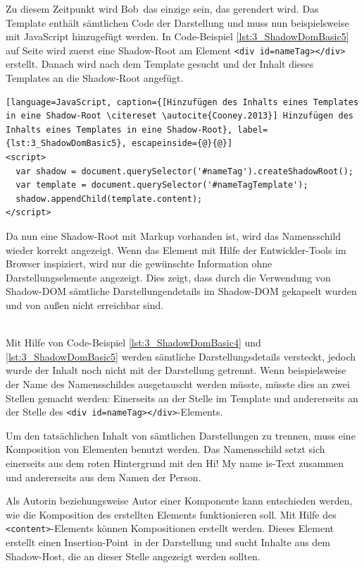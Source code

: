 \begin{enumerate}
Zu diesem Zeitpunkt wird \glqq Bob\grqq\ das einzige sein, das gerendert wird. Das Template enthält sämtlichen Code der Darstellung und muss nun beispielsweise mit JavaScript hinzugefügt werden. In Code-Beispiel \ref{lst:3_ShadowDomBasic5} auf Seite \pageref{lst:3_ShadowDomBasic5} wird zuerst eine Shadow-Root am Element \lstinline|<div id=nameTag></div>| erstellt. Danach wird nach dem Template gesucht und der Inhalt dieses Templates an die Shadow-Root angefügt.

\begin{lstlisting}[language=JavaScript, caption={[Hinzufügen des Inhalts eines Templates in eine Shadow-Root \citereset \autocite{Cooney.2013}] Hinzufügen des Inhalts eines Templates in eine Shadow-Root}, label={lst:3_ShadowDomBasic5}, escapeinside={@}{@}]
<script>
  var shadow = document.querySelector('#nameTag').createShadowRoot();
  var template = document.querySelector('#nameTagTemplate');
  shadow.appendChild(template.content);
</script>
\end{lstlisting}

Da nun eine Shadow-Root mit Markup vorhanden ist, wird das Namensschild wieder korrekt angezeigt. Wenn das Element mit Hilfe der Entwickler-Tools im Browser inspiziert, wird nur die gewünschte Information ohne Darstellungselemente angezeigt. Dies zeigt, dass durch die Verwendung von Shadow-DOM sämtliche Darstellungendetails im Shadow-DOM gekapselt wurden und von außen nicht erreichbar sind.

 \hfill \\
Mit Hilfe von Code-Beispiel \ref{lst:3_ShadowDomBasic4} und \ref{lst:3_ShadowDomBasic5} werden sämtliche Darstellungsdetails versteckt, jedoch wurde der Inhalt noch nicht mit der Darstellung getrennt. Wenn beispielsweise der Name des Namensschildes ausgetauscht werden müsste, müsste dies an zwei Stellen gemacht werden: Einerseits an der Stelle im Template und andererseits an der Stelle des \lstinline|<div id=nameTag></div>|-Elements.

Um den tatsächlichen Inhalt von sämtlichen Darstellungen zu trennen, muss eine Komposition von Elementen benutzt werden. Das Namensschild setzt sich einerseits aus dem roten Hintergrund mit den \glqq Hi! My name is\grqq -Text zusammen und andererseits aus dem Namen der Person.

Als Autorin beziehungsweise Autor einer Komponente kann entschieden werden, wie die Komposition des erstellten Elements funktionieren soll. Mit Hilfe des \lstinline|<content>|-Elements können Kompositionen erstellt werden. Dieses Element erstellt einen \glqq Insertion-Point\grqq\ in der Darstellung und sucht Inhalte aus dem Shadow-Host, die an dieser Stelle angezeigt werden sollten.


\end{enumerate}
